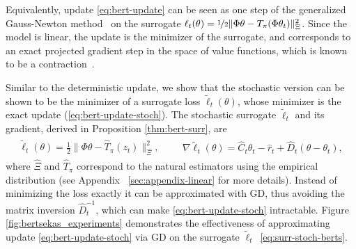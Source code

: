 \documentclass{article} %
\theoremstyle{definition}
\newcommand{\nnumbers}{\mathbb{N}}
\begin{document}
Equivalently, update \eqref{eq:bert-update} can be seen as one step of the generalized Gauss-Newton method~\citep{ortega2000iterative} on the surrogate $\ell_t(\theta) = \nicefrac{1}{2}\|\Phi \theta - T_{\pi}(\Phi\theta_t)\|^2_{\Xi}$. 
Since the model is linear, the update is the minimizer of the surrogate, and corresponds to an exact projected gradient step in the space of value functions, which is known to be a contraction~\citep{bertsekas2012dynamic}.

Similar to the deterministic update, we show that the stochastic version can be shown to be the minimizer of a surrogate loss $\tilde{\ell}_t(\theta)$, whose minimizer is the exact update (\ref{eq:bert-update-stoch}).
The stochastic surrogate $\tilde{\ell}_t$ and its gradient, derived in Proposition \ref{thm:bert-surr}, are
\begin{align} \label{eq:surr-stoch-berts}
    \begin{aligned}
        \tilde{\ell}_t(\theta) = \frac{1}{2}\|\Phi \theta - \hat{T}_{\pi}(z_t)\|^2_{\hat{\Xi}},
    \end{aligned}
    && 
    \begin{aligned}
        \nabla \tilde{\ell}_t(\theta) = \hat{C}_t \theta_t-\hat{r}_t + \hat{D}_t(\theta - \theta_t),
    \end{aligned}
\end{align}
where $\hat{\Xi}$ and $\hat{T}_{\pi}$ correspond to the natural estimators using the empirical distribution (see Appendix ~\ref{sec:appendix-linear} for more details). Instead of minimizing the loss exactly it can be approximated with GD, thus avoiding the matrix inversion $\hat{D}^{-1}_t$, which can make \eqref{eq:bert-update-stoch} intractable. 
Figure \ref{fig:bertsekas_experiments} demonstrates the effectiveness of approximating update \eqref{eq:bert-update-stoch} via GD on the surrogate $\tilde{\ell}_t$~\eqref{eq:surr-stoch-berts}.





\end{document}
